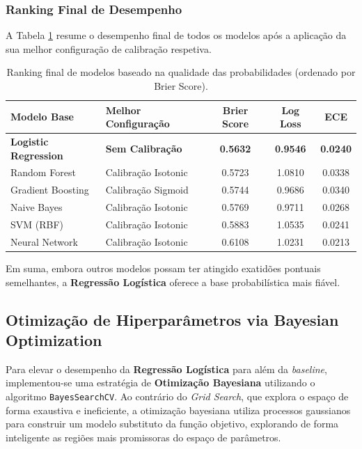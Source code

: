 \documentclass[10pt]{article}
\begin{document}
\subsubsection{Ranking Final de Desempenho}

A Tabela \ref{tab:ranking_final} resume o desempenho final de todos os modelos após a aplicação da sua melhor configuração de calibração respetiva.

\begin{table}[H]
\centering
\caption{Ranking final de modelos baseado na qualidade das probabilidades (ordenado por Brier Score).}
\label{tab:ranking_final}
\begin{tabular}{llccc}
\hline
\textbf{Modelo Base} & \textbf{Melhor Configuração} & \textbf{Brier Score} & \textbf{Log Loss} & \textbf{ECE} \\ \hline
\textbf{Logistic Regression} & \textbf{Sem Calibração} & \textbf{0.5632} & \textbf{0.9546} & \textbf{0.0240} \\
Random Forest & Calibração Isotonic & 0.5723 & 1.0810 & 0.0338 \\
Gradient Boosting & Calibração Sigmoid & 0.5744 & 0.9686 & 0.0340 \\
Naive Bayes & Calibração Isotonic & 0.5769 & 0.9711 & 0.0268 \\
SVM (RBF) & Calibração Isotonic & 0.5883 & 1.0535 & 0.0241 \\
Neural Network & Calibração Isotonic & 0.6108 & 1.0231 & 0.0213 \\ \hline
\end{tabular}
\end{table}

Em suma, embora outros modelos possam ter atingido exatidões pontuais semelhantes, a \textbf{Regressão Logística} oferece a base probabilística mais fiável.

\subsection{Otimização de Hiperparâmetros via Bayesian Optimization}

Para elevar o desempenho da \textbf{Regressão Logística} para além da \textit{baseline}, implementou-se uma estratégia de \textbf{Otimização Bayesiana} utilizando o algoritmo \texttt{BayesSearchCV}. Ao contrário do \textit{Grid Search}, que explora o espaço de forma exaustiva e ineficiente, a otimização bayesiana utiliza processos gaussianos para construir um modelo substituto da função objetivo, explorando de forma inteligente as regiões mais promissoras do espaço de parâmetros.
\end{document}
